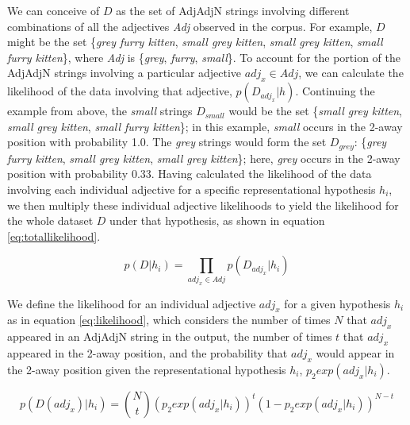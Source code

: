 \documentclass[10pt]{article}
\newcommand{\gkb}[1]{\textcolor{magenta}{[gkb: #1]}}
\newcommand{\lsp}[1]{\textcolor{violet}{[lsp: #1]}}
\begin{document}

We can conceive of $D$ as the set of  AdjAdjN strings involving different combinations of all the adjectives \emph{Adj} observed in the corpus. For example, $D$ might be the set \{\textit{grey furry kitten}, \textit{small grey kitten}, \emph{small grey kitten}, \textit{small furry kitten}\}, where \emph{Adj} is \{\emph{grey}, \emph{furry}, \emph{small}\}. To account for the  portion of the AdjAdjN strings involving a particular adjective $adj_x \in Adj$, we can calculate the likelihood of the data involving that adjective, $p(D_{adj_x} | h)$. 
Continuing the example from above, the \textit{small} strings $D_{small}$ would be the set \{\textit{small grey kitten}, \emph{small grey kitten}, \textit{small furry kitten}\}; in this example, \textit{small} occurs in the 2-away position with probability 1.0. The \textit{grey} strings would form the set $D_{grey}$: \{\textit{grey furry kitten}, \textit{small grey kitten}, \emph{small grey kitten}\}; here, \textit{grey} occurs in the 2-away position with probability 0.33. Having calculated the likelihood of the data involving each individual adjective for a specific representational hypothesis $h_i$, we then multiply these individual adjective likelihoods to yield the likelihood for the whole dataset $D$ under that hypothesis, as shown in equation \eqref{eq:totallikelihood}.

\setcounter{equation}{2} %
\begin{equation} 
\label{eq:totallikelihood}
p(D|h_i) = \prod_{adj_x\in Adj} p(D_{adj_x}|h_i)
\end{equation}

We define the likelihood for an individual adjective $adj_x$ for a given hypothesis $h_i$
as in equation \eqref{eq:likelihood}, which considers the number of times $N$ that $adj_x$ appeared in an AdjAdjN string in the output, 
the number of times $t$ that $adj_x$ appeared in the 2-away position, and 
the probability that $adj_x$ would appear in the 2-away position given the representational hypothesis $h_i$, $p_2exp(adj_x | h_i)$. 

\begin{equation}
\label{eq:likelihood}
p(D(adj_x)|h_i) = \binom{N}{t}(p_2exp(adj_x|h_i))^t(1-p_2exp(adj_x|h_i))^{N-t}
\end{equation}
\end{document}

